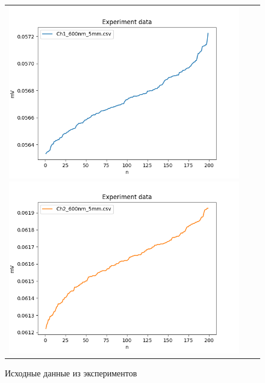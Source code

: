 \documentclass[../main.tex]{subfiles}
\begin{document}
\begin{figure}[H]
	\begin{tabular}{ccc}
		\includegraphics[scale=0.5]{figures/input_PR1.png}
		\includegraphics[scale=0.5]{figures/input_PR2.png}
	\end{tabular}
	\caption{Исходные данные из экспериментов} 
\end{figure}
\end{document}
